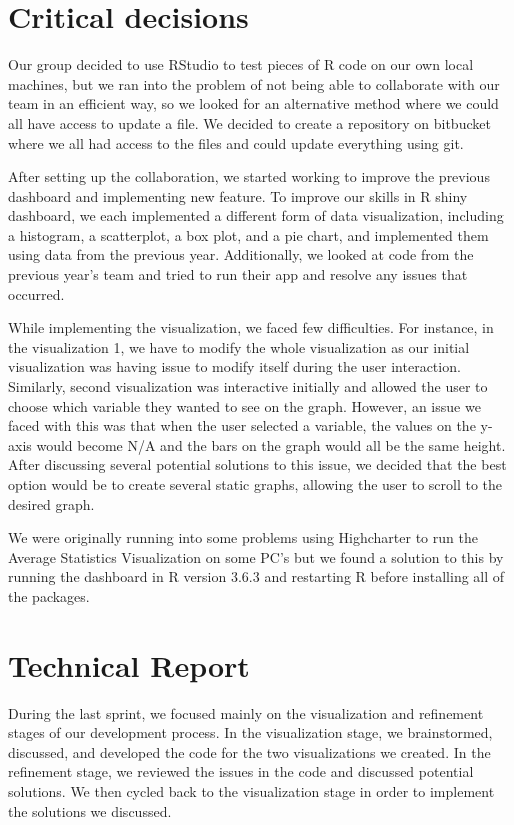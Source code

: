 \documentclass[]{book}
\begin{document}
\section{Critical decisions}\label{critical-decisions}

Our group decided to use RStudio to test pieces of R code on our own
local machines, but we ran into the problem of not being able to
collaborate with our team in an efficient way, so we looked for an
alternative method where we could all have access to update a file. We
decided to create a repository on bitbucket where we all had access to
the files and could update everything using git.

After setting up the collaboration, we started working to improve the
previous dashboard and implementing new feature. To improve our skills
in R shiny dashboard, we each implemented a different form of data
visualization, including a histogram, a scatterplot, a box plot, and a
pie chart, and implemented them using data from the previous year.
Additionally, we looked at code from the previous year's team and tried
to run their app and resolve any issues that occurred.

While implementing the visualization, we faced few difficulties. For
instance, in the visualization 1, we have to modify the whole
visualization as our initial visualization was having issue to modify
itself during the user interaction. Similarly, second visualization was
interactive initially and allowed the user to choose which variable they
wanted to see on the graph. However, an issue we faced with this was
that when the user selected a variable, the values on the y-axis would
become N/A and the bars on the graph would all be the same height. After
discussing several potential solutions to this issue, we decided that
the best option would be to create several static graphs, allowing the
user to scroll to the desired graph.

We were originally running into some problems using Highcharter to run
the Average Statistics Visualization on some PC's but we found a
solution to this by running the dashboard in R version 3.6.3 and
restarting R before installing all of the packages.

\section{Technical Report}\label{technical-report-1}

During the last sprint, we focused mainly on the visualization and
refinement stages of our development process. In the visualization
stage, we brainstormed, discussed, and developed the code for the two
visualizations we created. In the refinement stage, we reviewed the
issues in the code and discussed potential solutions. We then cycled
back to the visualization stage in order to implement the solutions we
discussed.
\end{document}
